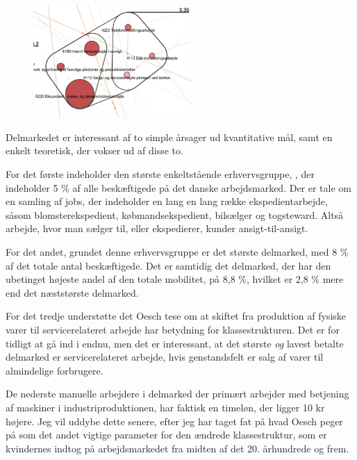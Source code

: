 %
\begin{figure}
  \vspace{-20pt}
  \begin{center}
    \includegraphics[width=6cm]{fig/segzoom/seg_3_35_timeloen.pdf}
   \caption{}
   \label{fig_delanalyse1_zoom_3_35}
  \end{center}
  \vspace{-20pt}
\end{figure}
%

Delmarkedet er interessant af to simple årsager ud kvantitative mål, samt en enkelt teoretisk, der vokser ud af disse to. 

For det første indeholder den største enkeltstående erhvervsgruppe, ,  der indeholder 5 \% af alle beskæftigede på det danske arbejdsmarked. Der er tale om en samling af jobs, der indeholder en lang en lang række ekspedientarbejde, såsom blomsterekspedient, købmandsekspedient, bilsælger og togsteward. Altså arbejde, hvor man sælger til, eller ekspedierer, kunder ansigt-til-ansigt. 

For det andet, grundet denne erhvervsgruppe er  det største delmarked, med 8 \% af det totale antal beskæftigede. Det er samtidig det delmarked, der har den ubetinget højeste andel af den totale mobilitet, på 8,8 \%, hvilket er 2,8 \% mere end det næststørste delmarked. 

For det tredje understøtte det Oesch tese om at skiftet fra produktion af fysiske varer til servicerelateret arbejde har betydning for klassestrukturen. Det er for tidligt at gå ind i endnu, men det er interessant, at det største \emph{og} lavest betalte delmarked er servicerelateret arbejde, hvis genstandsfelt er salg af varer til almindelige forbrugere. 

De nederste manuelle arbejdere i delmarked  der primært arbejder med betjening af maskiner i industriproduktionen, har faktisk en timeløn, der ligger 10 kr højere. Jeg vil uddybe dette senere, efter jeg har taget fat på hvad Oesch peger på som det andet vigtige parameter for den ændrede klassestruktur, som er kvindernes indtog på arbejdsmarkedet fra midten af det 20. århundrede og frem. 





